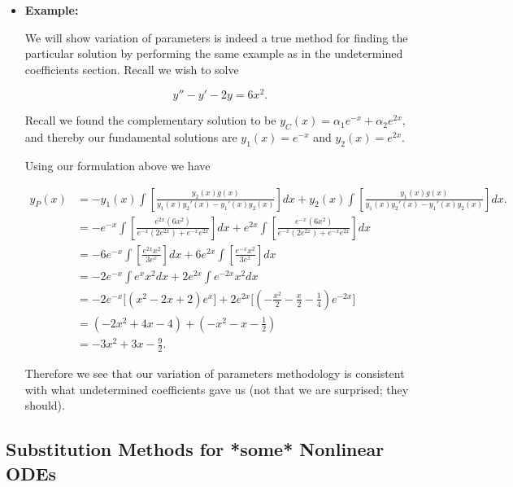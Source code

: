 \begin{itemize}
\begin{itemize}
\item {\bf{Example:}}
 
 We will show variation of parameters is indeed a true method for finding the particular solution by performing the same example as in the undetermined coefficients section. Recall we wish to solve
 
 $$y'' - y' - 2y = 6x^2.$$

Recall we found the complementary solution to be $y_C(x) = \alpha_1 e^{-x} + \alpha_2 e^{2x},$  and thereby our fundamental solutions are $y_1(x) = e^{-x}$ and $y_2(x) = e^{2x}.$

Using our formulation above we have 

\begin{align*}
y_P(x) &= -y_1(x) \int \left[ \frac{y_2(x) g(x) }{y_1(x) y_2'(x) - y_1'(x) y_2(x)} \right] dx + y_2(x)  \int \left[ \frac{y_1(x) g(x) }{y_1(x) y_2'(x) - y_1'(x) y_2(x)} \right] dx.\\
&= -e^{-x} \int \left[ \frac{e^{2x} (6x^2) }{e^{-x} \left(2e^{2x}\right) + e^{-x}e^{2x}} \right] dx + e^{2x}  \int \left[ \frac{e^{-x}(6x^2) }{e^{-x} \left(2e^{2x}\right) + e^{-x}e^{2x}}  \right] dx \\
&= -6e^{-x} \int \left[  \frac{e^{2x} x^2}{3e^x} \right] dx + 6e^{2x} \int \left[ \frac{e^{-x}x^2}{3e^{x}} \right] dx \\
&=-2e^{-x} \int e^{x}x^2 dx + 2e^{2x} \int e^{-2x}x^2 dx \\
&=-2e^{-x} \Big[(x^2-2x+2)e^x\Big] + 2e^{2x} \Big[ \left(-\frac{x^2}{2} - \frac{x}{2} - \frac{1}{4}\right)e^{-2x} \Big]\\
&= (-2x^2+4x-4)+\left(-x^2-x-\frac{1}{2}\right) \\
&= -3x^2 + 3x -\frac{9}{2}.
\end{align*}
 
 Therefore we see that our variation of parameters methodology is consistent with what undetermined coefficients gave us (not that we are surprised; they should).
 
\end{itemize}

\end{itemize}


%
%

\subsection{Substitution Methods for *some* Nonlinear ODEs}

